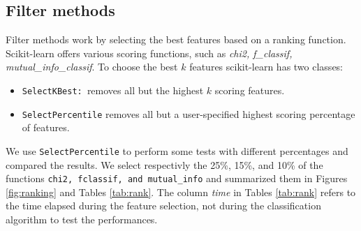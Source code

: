 \subsection{Filter methods}

Filter methods work by selecting the best features based on a ranking function. Scikit-learn offers various scoring functions, such as \textit{chi2, f\_classif, mutual\_info\_classif}. To choose the best $k$ features scikit-learn has two classes:
\begin{itemize}
	\item \texttt{SelectKBest: }removes all but the highest $k$ scoring features.
	\item \texttt{SelectPercentile} removes all but a user-specified highest scoring percentage of features.
\end{itemize} 
We use \texttt{SelectPercentile} to perform some tests with different percentages and compared the results. 
We select respectivly the 25\%, 15\%, and 10\% of the functions \texttt{chi2, fclassif, and mutual\_info} and summarized them in Figures \ref{fig:ranking} and Tables \ref{tab:rank}. The column \textit{time} in Tables \ref{tab:rank} refers to the time elapsed during the feature selection, not during the classification algorithm to test the performances.

